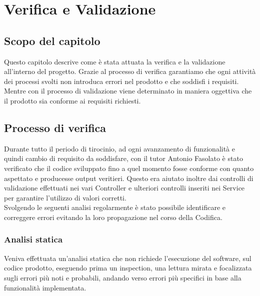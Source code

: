 \chapter{Verifica e Validazione}
\label{cap:verifica-validazione}
\section{Scopo del capitolo}
Questo capitolo descrive come è stata attuata la verifica e la validazione all'interno del progetto. Grazie al processo di verifica garantiamo che ogni attività dei processi svolti non introduca errori nel prodotto e che soddisfi i requisiti. Mentre con il processo di validazione viene determinato in maniera oggettiva che il prodotto sia conforme ai requisiti richiesti.
\section{Processo di verifica}
Durante tutto il periodo di tirocinio, ad ogni avanzamento di funzionalità e quindi cambio di requisito da soddisfare, con il tutor Antonio Fasolato è stato verificato che il codice sviluppato fino a quel momento fosse conforme con quanto aspettato e producesse output veritieri. Questo era aiutato inoltre dai controlli di validazione effettuati nei vari Controller e ulteriori controlli inseriti nei Service per garantire l’utilizzo di valori corretti.\\
Svolgendo le seguenti analisi regolarmente è stato possibile identificare e correggere errori evitando la loro propagazione nel corso della Codifica.
\subsection{Analisi statica}
Veniva effettuata un’analisi statica che non richiede l'esecuzione del software, sul codice prodotto, eseguendo prima un inspection, una lettura mirata e focalizzata sugli errori più noti e probabili, andando verso errori più specifici in base alla funzionalità implementata.
